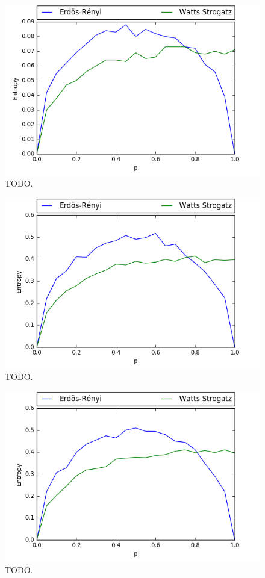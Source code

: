 \documentclass[journal]{IEEEtran}
\begin{document}
\begin{figure}[ht]
    \centering
    \includegraphics[width=\linewidth]{res/entropy1/experiment_n1000.png}
    \caption{TODO.
    }
\end{figure}

\begin{figure}[ht]
    \centering
    \includegraphics[width=\linewidth]{res/entropy2/experiment_n500.png}
    \caption{TODO.
    }
\end{figure}

\begin{figure}[ht]
    \centering
    \includegraphics[width=\linewidth]{res/entropy2/experiment_n1000.png}
    \caption{TODO.
    }
\end{figure}
\end{document}
